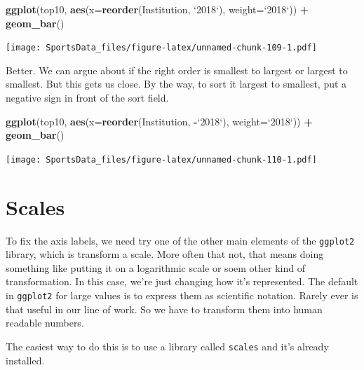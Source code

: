 \documentclass[]{book}
\newenvironment{Shaded}{\begin{snugshade}}{\end{snugshade}}
\newcommand{\KeywordTok}[1]{\textcolor[rgb]{0.13,0.29,0.53}{\textbf{#1}}}
\newcommand{\DataTypeTok}[1]{\textcolor[rgb]{0.13,0.29,0.53}{#1}}
\newcommand{\StringTok}[1]{\textcolor[rgb]{0.31,0.60,0.02}{#1}}
\newcommand{\OperatorTok}[1]{\textcolor[rgb]{0.81,0.36,0.00}{\textbf{#1}}}
\newcommand{\NormalTok}[1]{#1}
\begin{document}
\begin{Shaded}
\begin{Highlighting}[]
\KeywordTok{ggplot}\NormalTok{(top10, }\KeywordTok{aes}\NormalTok{(}\DataTypeTok{x=}\KeywordTok{reorder}\NormalTok{(Institution, }\StringTok{`}\DataTypeTok{2018}\StringTok{`}\NormalTok{), }\DataTypeTok{weight=}\StringTok{`}\DataTypeTok{2018}\StringTok{`}\NormalTok{)) }\OperatorTok{+}\StringTok{ }\KeywordTok{geom_bar}\NormalTok{()}
\end{Highlighting}
\end{Shaded}

\texttt{[image: SportsData\_files/figure-latex/unnamed-chunk-109-1.pdf]}

Better. We can argue about if the right order is smallest to largest or
largest to smallest. But this gets us close. By the way, to sort it
largest to smallest, put a negative sign in front of the sort field.

\begin{Shaded}
\begin{Highlighting}[]
\KeywordTok{ggplot}\NormalTok{(top10, }\KeywordTok{aes}\NormalTok{(}\DataTypeTok{x=}\KeywordTok{reorder}\NormalTok{(Institution, }\OperatorTok{-}\StringTok{`}\DataTypeTok{2018}\StringTok{`}\NormalTok{), }\DataTypeTok{weight=}\StringTok{`}\DataTypeTok{2018}\StringTok{`}\NormalTok{)) }\OperatorTok{+}\StringTok{ }\KeywordTok{geom_bar}\NormalTok{()}
\end{Highlighting}
\end{Shaded}

\texttt{[image: SportsData\_files/figure-latex/unnamed-chunk-110-1.pdf]}

\section{Scales}\label{scales}

To fix the axis labels, we need try one of the other main elements of
the \texttt{ggplot2} library, which is transform a scale. More often
that not, that means doing something like putting it on a logarithmic
scale or soem other kind of transformation. In this case, we're just
changing how it's represented. The default in \texttt{ggplot2} for large
values is to express them as scientific notation. Rarely ever is that
useful in our line of work. So we have to transform them into human
readable numbers.

The easiest way to do this is to use a library called \texttt{scales}
and it's already installed.
\end{document}
